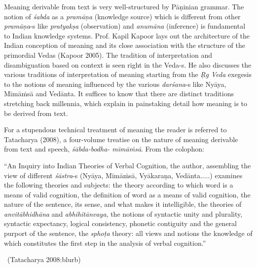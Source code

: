 Meaning derivable from text is very well-structured by Pāṇinian grammar. The notion of \textit{śabda} as a \textit{pramāṇa} (knowledge source) which is different from other \textit{pramāṇa}-s like \textit{pratyakṣa} (observation) and \textit{anumāna} (inference) is fundamental to Indian knowledge systems. Prof. Kapil Kapoor lays out the architecture of the Indian conception of meaning and its close association with the structure of the primordial Vedas (Kapoor 2005). The tradition of interpretation and disambiguation based on context is seen right in the Veda-s. He also discusses the various traditions of interpretation of meaning starting from the \textit{Ṛg Veda} exegesis to the notions of meaning influenced by the various \textit{darśana}-s like Nyāya, Mīmāṁsā and Vedānta. It suffices to know that there are distinct traditions stretching back millennia, which explain in painstaking detail how meaning is to be derived from text.

For a stupendous technical treatment of meaning the reader is referred to Tatacharya (2008), a four-volume treatise on the nature of meaning derivable from text and speech, \textit{śābda-bodha- mīmāṁsā}. From the colophon:

\begin{myquote}
“An Inquiry into Indian Theories of Verbal Cognition, the author, assembling the view of different \textit{śāstra}-s (Nyāya, Mīmāṁsā, Vyākaraṇa, Vedānta.....) examines the following theories and subjects: the theory according to which word is a means of valid cognition, the definition of word as a means of valid cognition, the nature of the sentence, its sense, and what makes it intelligible, the theories of \textit{anvitābhidhāna} and \textit{abhihitānvaya}, the notions of syntactic unity and plurality, syntactic expectancy, logical consistency, phonetic contiguity and the general purport of the sentence, the \textit{sphoṭa} theory: all views and notions the knowledge of which constitutes the first step in the analysis of verbal cognition.”

~\hfill (Tatacharya 2008:blurb)
\end{myquote}

